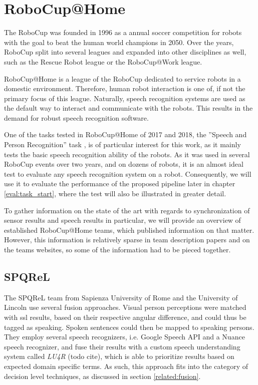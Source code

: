 
\section{RoboCup@Home}
The RoboCup was founded in 1996 as a annual soccer competition for robots with the goal to beat the human world champions in 2050.
Over the years, RoboCup split into several leagues and expanded into other disciplines as well, such as the Rescue Robot league or the RoboCup@Work league.

RoboCup@Home is a league of the RoboCup dedicated to service robots in a domestic environment. %
Therefore, human robot interaction is one of, if not the primary focus of this league.
Naturally, speech recognition systems are used as the default way to interact and communicate with the robots.
This results in the demand for robust speech recognition software.%

One of the tasks tested in RoboCup@Home of 2017 and 2018, the ''Speech and Person Recognition'' task \cite{rulebook_2018}, is of particular interest for this work, as it mainly tests the basic speech recognition ability of the robots. 
As it was used in several RoboCup events over two years, and on dozens of robots, it is an almost ideal test to evaluate any speech recognition system on a robot.
Consequently, we will use it to evaluate the performance of the proposed pipeline later in chapter \ref{eval:task_start}, where the test will also be illustrated in greater detail. 

To gather information on the state of the art with regards to synchronization of sensor results and speech results in particular, we will provide an overview of established RoboCup@Home teams, which published information on that matter.
However, this information is relatively sparse in team description papers and on the teams websites, so some of the information had to be pieced together.

\subsection{SPQReL}
The SPQReL team from Sapienza University of Rome and the University of Lincoln use several fusion approaches.
Visual person perceptions were matched with \gls{ssl} results, based on their respective angular difference, and could thus be tagged as speaking.
Spoken sentences could then be mapped to speaking persons.
They employ several speech recognizers, i.e. Google Speech API and a Nuance speech recognizer, and fuse their results with a custom speech understanding system called \textit{LU4R} (todo cite), which is able to prioritize results based on expected domain specific terms. 
As such, this approach fits into the category of decision level techniques, as discussed in section \ref{related:fusion}.

